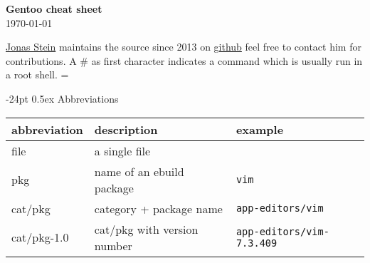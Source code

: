 \documentclass[landscape]{article}
\makeatletter
\renewcommand\section{\@startsection{section}{1}{0mm}%
                                     {-24pt}%
                                     {0.5ex}%
                                {\color{black}\normalfont\large\bfseries}}
\newcommand{\code}{\texttt}
\newcommand{\asroot}{\# }
\newcommand{\file}{{\color{magenta} file}\xspace}
\newcommand{\pkg}{{\color{blue} pkg}\xspace}
\newcommand{\cp}{{\color{blue} cat/pkg}\xspace}
\newcommand{\cpv}{{\color{blue} cat/pkg-1.0}\xspace}
\makeatother
\begin{document}
\footnotesize
\begin{multicols*}{2}

\setlength{\premulticols}{1pt}
\setlength{\postmulticols}{1pt}
\setlength{\multicolsep}{1pt}
\setlength{\columnsep}{2pt}

\begin{center}
     {\Large{\textbf{\color{black}Gentoo cheat sheet}}} \\
 \today
\end{center}
\href{mailto:news@jonasstein.de}{Jonas Stein} maintains 
the source since 2013 on \href{https://github.com/jonasstein/gentoo-cheat}{github} feel free to contact him for contributions. A \asroot as first character indicates a command which is usually run in a root shell. 
\everypar={\hangindent=9mm}

\section{Abbreviations}

\begin{tabular}{lll}
\toprule abbreviation & description & example \\ 
\toprule \file  & a single \file &  \\ 
\midrule \pkg &  name of an ebuild package & \code{vim} \\ 
\midrule \cp & category + package name & \code{app-editors/vim} \\ 
\midrule \cpv & \cp with version number & \code{app-editors/vim-7.3.409}\\
\bottomrule 
\end{tabular} \\






\end{multicols*}
\end{document}
